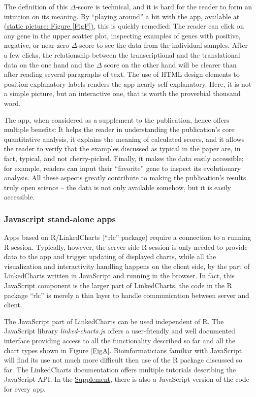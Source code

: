 \documentclass[twocolumn,10pt]{article}
\newcommand{\Supplement}{\href{https://anders-biostat.github.io/lc-paper/}{Supplement}}
\begin{document}
The definition of this $\Delta$-score is technical, and it is hard for the reader to form an intuition on its meaning. By ``playing around'' a bit with the app, available at \href{https://ex2plorer.kaessmannlab.org/}{(static picture: Figure \ref{FigF})}, this is quickly remedied:  The reader can click on any gene in the upper scatter plot, inspecting examples of genes with positive, negative, or near-zero $\Delta$-score to see the data from the individual samples. After a few clicks, the relationship between the transcriptional and the translational data on the one hand and the $\Delta$ score on the other hand will be clearer than after reading several paragraphs of text. The use of HTML design elements to position explanatory labels renders the app nearly self-explanatory. Here, it is not a simple picture, but an interactive one, that is worth the proverbial thousand word. 

The app, when considered as a supplement to the publication, hence offers multiple benefits: It helps the reader in understanding the publication's core quantitative analysis, it explains the meaning of calculated scores, and it allows the reader to verify that the examples discussed as typical in the paper are, in fact, typical, and not cherry-picked. Finally, it makes the data easily accessible; for example, readers can input their ``favorite'' gene to inspect its evolutionary analysis. All these aspects greatly contribute to making the publication's results truly open science -- the data is not only available somehow, but it is easily accessible.

\subsubsection{Javascript stand-alone apps}

Apps based on R/LinkedCharts (``rlc'' package) require a connection to a running R session. Typically, however, the server-side R session is only needed to provide data to the app and trigger updating of displayed charts, while all the visualization and interactivity handling happens on the client side, by the part of LinkedCharts written in JavaScript and running in the browser. In fact, this JavaScript component is the larger part of LinkedCharts, the code in the R package ``rlc'' is merely a thin layer to handle communication between server and client.

The JavaScript part of LinkedCharts can be used independent of R. The JavaScript library \emph{linked-charts.js} offers a user-friendly and well documented interface providing access to all the functionality described so far and all the chart types shown in Figure \ref{FigA}. Bioinformaticians familiar with JavaScript will find its use not much more difficult then use of the R package discussed so far. The LinkedCharts documentation offers multiple tutorials  describing the JavaScript API. In the \Supplement, there is also a JavaScript version of the code for every app.
\end{document}

